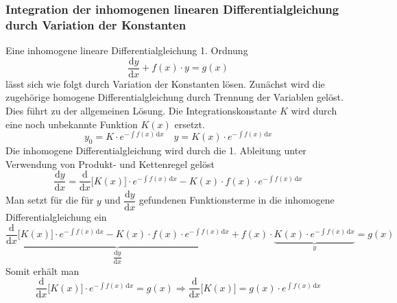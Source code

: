 \subsubsection{Integration der inhomogenen linearen Differentialgleichung durch Variation der Konstanten}
Eine inhomogene lineare Differentialgleichung 1. Ordnung 
\begin{equation}
\boxed{\dfrac{\text{d}y}{\text{d}x}+f\left(x\right)\cdot y=g\left(x\right)}
\end{equation}
lässt sich wie folgt durch Variation der Konstanten lösen. Zunächst wird die zugehörige homogene Differentialgleichung durch Trennung der Variablen gelöst. Dies führt zu der allgemeinen Lösung. Die Integrationskonstante $K$ wird durch eine noch unbekannte Funktion $K\left(x\right)$ ersetzt. 
\begin{equation} 
\boxed{y_0=K\cdot e^{-\displaystyle \int f\left(x\right)\,\text{d}x}}\quad \boxed{y=K\left(x\right)\cdot e^{-\displaystyle \int f\left(x\right)\,\text{d}x}}
\end{equation} 
Die inhomogene Differentialgleichung wird durch die 1. Ableitung unter Verwendung von Produkt- und Kettenregel gelöst
\begin{equation}
\boxed{\dfrac{\text{d}y}{\text{d}x}=\dfrac{\text{d}}{\text{d}x}\Big[K\left(x\right)\Big]\cdot e^{-\displaystyle \int f\left(x\right)\,\text{d}x}-K\left(x\right)\cdot f\left(x\right)\cdot e^{-\displaystyle \int f\left(x\right)\,\text{d}x}}
\end{equation}
Man setzt für die für $y$ und $\dfrac{\text{d}y}{\text{d}x}$ gefundenen Funktionsterme in die inhomogene Differentialgleichung ein
\begin{equation}
\boxed{\underbrace{\dfrac{\text{d}}{\text{d}x}\Big[K\left(x\right)\Big]\cdot e^{-\displaystyle \int f\left(x\right)\,\text{d}x}-K\left(x\right)\cdot f\left(x\right)\cdot e^{-\displaystyle \int f\left(x\right)\,\text{d}x}}_{\dfrac{\text{d}y}{\text{d}x}}+f\left(x\right)\cdot \underbrace{K\left(x\right)\cdot e^{-\displaystyle \int f\left(x\right)\,\text{d}x}}_{y}=g\left(x\right)}
\end{equation}
Somit erhält man
\begin{equation}
\boxed{\dfrac{\text{d}}{\text{d}x}\Big[K\left(x\right)\Big]\cdot e^{-\displaystyle \int f\left(x\right)\,\text{d}x}=g\left(x\right)\Longrightarrow \dfrac{\text{d}}{\text{d}x}\Big[K\left(x\right)\Big]=g\left(x\right)\cdot e^{\displaystyle \int f\left(x\right)\,\text{d}x}}
\end{equation}

